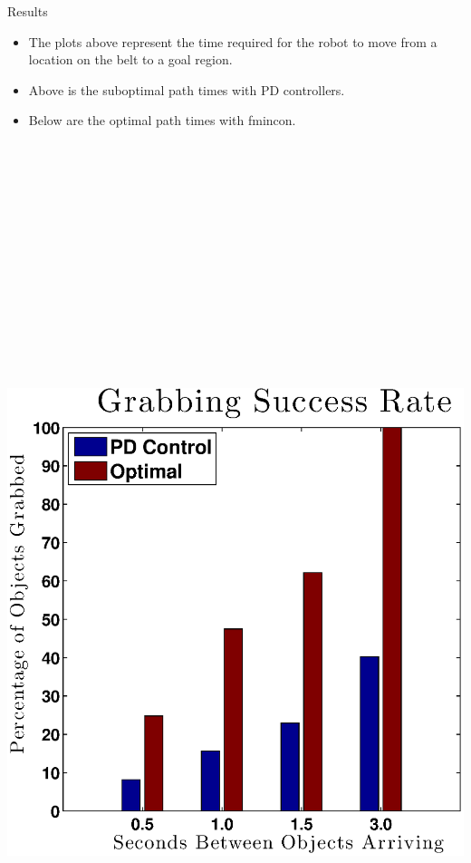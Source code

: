 \documentclass[final]{beamer}
\begin{document}
\begin{frame}{}
{\begin{columns}[t]
\begin{column}{.30\linewidth}
\begin{block}{\centering Results}
\begin{itemize}
		\setlength{\itemindent}{0.32in}
	\item The plots above represent the time required for the robot to move from a location on the
		belt to a goal region. 
	\item Above is the suboptimal path times with PD controllers. 
	\item Below are the optimal path times with fmincon. 
\end{itemize}

\vspace{2cm}


\centering\includegraphics[height=28cm, width=30cm]{figures/bar_graph.eps}


\end{block}
\end{column}
\end{columns}}
\end{frame}
\end{document}
